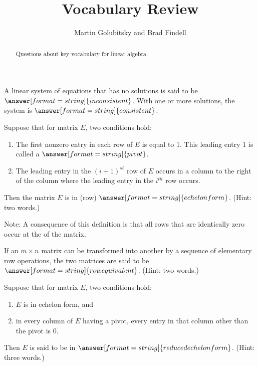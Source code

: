 \documentclass[nooutcomes]{ximera}
\title{Vocabulary Review}
\author{Martin Golubitsky and Brad Findell}
\begin{document}
\begin{abstract}
Questions about key vocabulary for linear algebra.
\end{abstract}
\maketitle


\begin{question}
A linear system of equations that has no solutions is said to be $\answer[format=string]{inconsistent}$.  With one or more solutions, the system is $\answer[format=string]{consistent}$. 
\end{question} 

\begin{question}
Suppose that for matrix $E$, two conditions hold:
\begin{enumerate}
\item The first nonzero entry in each row of $E$ is equal to $1$. This leading entry $1$ is called a 
$\answer[format=string]{pivot}$.
\item The leading entry in the $(i + 1)^{st}$ row of $E$ occurs in a column to the right of the column where the leading entry in the $i^{th}$ row occurs.
\end{enumerate}
Then the matrix $E$ is in (row) $\answer[format=string]{echelon form}$.  (Hint: two words.)

Note: A consequence of this definition is that all rows that are identically zero occur at the  of the matrix.
\end{question} 

\begin{question}
If an $m \times n$ matrix can be transformed into another by a sequence of elementary row operations, the two matrices are said to be $\answer[format=string]{row equivalent}$.  (Hint: two words.)
\end{question} 

\begin{question}
Suppose that for matrix $E$, two conditions hold:
\begin{enumerate}
\item $E$ is in echelon form, and
\item in every column of $E$ having a pivot, every entry in that column other than the pivot is $0$.
\end{enumerate}
Then $E$ is said to be in $\answer[format=string]{reduced echelon form}$.  (Hint: three words.) 
\end{question} 
\end{document}
